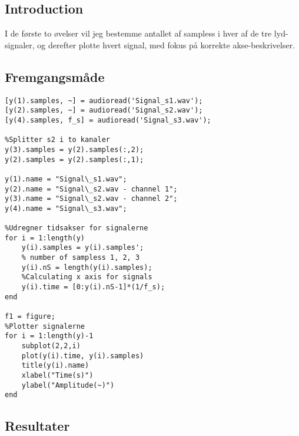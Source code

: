 \documentclass[../main.tex]{subfiles}
\begin{document}
\subsection{Introduction}

I de første to øvelser vil jeg bestemme antallet af sampless i hver af de tre lyd-signaler, og derefter plotte hvert signal, med fokus på korrekte akse-beskrivelser.

\subsection{Fremgangsmåde}

\begin{lstlisting}[caption={Matlab kode for øvelse 1 \& 2}, label={lst:myLST}]
% Lægger filerne ind i arrays
[y(1).samples, ~] = audioread('Signal_s1.wav');
[y(2).samples, ~] = audioread('Signal_s2.wav');
[y(4).samples, f_s] = audioread('Signal_s3.wav');

%Splitter s2 i to kanaler
y(3).samples = y(2).samples(:,2);
y(2).samples = y(2).samples(:,1);

y(1).name = "Signal\_s1.wav";
y(2).name = "Signal\_s2.wav - channel 1";
y(3).name = "Signal\_s2.wav - channel 2";
y(4).name = "Signal\_s3.wav";

%Udregner tidsakser for signalerne
for i = 1:length(y)
    y(i).samples = y(i).samples';
    % number of sampless 1, 2, 3
    y(i).nS = length(y(i).samples);
    %Calculating x axis for signals
    y(i).time = [0:y(i).nS-1]*(1/f_s);
end

f1 = figure;
%Plotter signalerne
for i = 1:length(y)-1
    subplot(2,2,i)
    plot(y(i).time, y(i).samples)
    title(y(i).name)
    xlabel("Time(s)")
    ylabel("Amplitude(~)")
end
\end{lstlisting}

\subsection{Resultater}

\end{document}
